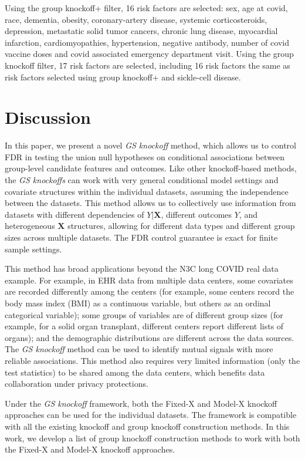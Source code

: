 \documentclass[11pt]{article}
\theoremstyle{plain}
\theoremstyle{definition}
\theoremstyle{remark}
\newcommand{\X}{\mathbf{X}}
\newcommand{\0}{\mathbf{0}}
\begin{document}
Using the group knockoff+ filter, 16 risk factors are selected: sex, age at covid, race, dementia, obesity, coronary-artery disease, systemic corticosteroids, depression, metastatic solid tumor cancers, chronic lung disease, myocardial infarction, cardiomyopathies, hypertension, negative antibody, number of covid vaccine doses and covid associated emergency department visit. Using the group knockoff filter, 17 risk factors are selected, including 16 risk factors the same as risk factors selected using group knockoff+ and sickle-cell disease. 





\section{Discussion}
In this paper, we present a novel \textit{GS knockoff} method, which allows us to control FDR in testing the union null hypotheses on conditional associations between group-level candidate features and outcomes. Like other knockoff-based methods, the \textit{GS knockoffs} can work with very general conditional model settings and covariate structures within the individual datasets, assuming the independence between the datasets. This method allows us to collectively use information from datasets with different dependencies of $Y|\X$, different outcomes $Y$, and heterogeneous $\X$ structures, allowing for different data types and different group sizes across multiple datasets. The FDR control guarantee is exact for finite sample settings. 

This method has broad applications beyond the N3C long COVID real data example. For example, in EHR data from multiple data centers, some covariates are recorded differently among the centers (for example, some centers record the body mass index (BMI) as a continuous variable, but others as an ordinal categorical variable); some groups of variables are of different group sizes (for example, for a solid organ transplant, different centers report different lists of organs); and the demographic distributions are different across the data sources. The \textit{GS knockoff} method can be used to identify mutual signals with more reliable associations. This method also requires very limited information (only the test statistics) to be shared among the data centers, which benefits data collaboration under privacy protections.

Under the \textit{GS knockoff} framework, both the Fixed-X and Model-X knockoff approaches can be used for the individual datasets. The framework is compatible with all the existing knockoff and group knockoff construction methods. In this work, we develop a list of group knockoff construction methods to work with both the Fixed-X and Model-X knockoff approaches. 
\nocite{langley00}
\end{document}
